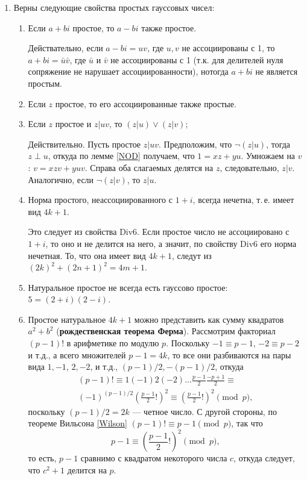 \begin{enumerate}
\item Верны следующие свойства простых гауссовых чисел:
\begin{enumerate}
\item Если $a+bi$ простое, то $a-bi$ также простое.

Действательно, если $a-bi=uv$, где $u,v$ не ассоциированы с 1, то $a+bi=\bar u\bar v$, где $\bar u$ и $\bar v$ не ассоциированы  с 1 (т.к. для делителей нуля сопряжение не нарушает ассоциированности), нотогда $a+bi$ не является простым.
\item Если $z$ простое, то его ассоциированные также простые.
\item Если $z$ простое и $z|uv$, то $(z|u)\vee(z|v)$;

Действительно. Пусть простое $z|uv$. Предположим, что $\neg(z|u)$, тогда $z\perp u$, откуда по лемме \ref{NOD} получаем, что $1=xz+yu$. Умножаем на $v$: $v=xzv+yuv$. Справа оба слагаемых делятся на $z$, следовательно, $z|v$. Аналогично, если $\neg(z|v)$, то $z|u$.

\item Норма простого, неассоциированного с $1+i$, всегда нечетна, т.\,е. имеет вид $4k+1$.

Это следует из свойства Div6. Если простое число не ассоциировано с $1+i$, то оно и не делится на него, а значит, по свойству Div6 его норма нечетная. То, что она имеет вид $4k+1$, следут из $(2k)^2+(2n+1)^2=4m+1$.
\item Натуральное простое не всегда есть гауссово простое: $5=(2+i)(2-i)$.
\item Простое натуральное $4k+1$ можно представить как сумму квадратов $a^2+b^2$ (\textbf{рождественская теорема Ферма}).
\pf Рассмотрим факториал $(p-1)!$ в арифметике по модулю $p$. Поскольку $-1\equiv p-1$, $-2\equiv p-2$ и т.д., а всего множителей $p-1=4k$, то все они разбиваются на пары вида $1,-1$, $2,-2$, и т.д., $(p-1)/2,-(p-1)/2$, откуда
\begin{multline*}
(p-1)! \equiv 1(-1)2(-2)\dots\frac{p-1}{2}\frac{-p+1}{2} \equiv \\
 (-1)^{(p-1)/2}\left(\frac{p-1}{2}!\right)^2 \equiv \left(\frac{p-1}{2}!\right)^2\pmod p,
\end{multline*}
поскольку $(p-1)/2=2k$ --- четное число. С другой стороны, по теореме Вильсона \ref{Wilson} $(p-1)!\equiv p-1\pmod p$, так что
$$
p-1\equiv \left(\frac{p-1}{2}!\right)^2\pmod p,
$$
то есть, $p-1$ сравнимо с квадратом некоторого числа $c$, откуда следует, что $c^2+1$ делится на $p$.


\end{enumerate}
\end{enumerate}
